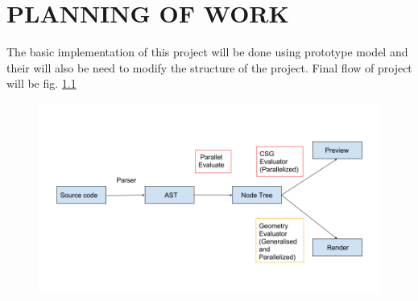 \chapter{PLANNING OF WORK}

The basic implementation of this project will be done using prototype model and their will also be need to modify the structure of the project. Final flow of project will be fig. \ref{fig:finalflow}

\begin{figure}[!h]
\centering
\includegraphics[width=\linewidth]{images/finalflow}
\caption{}
\label{fig:finalflow}
\end{figure}

